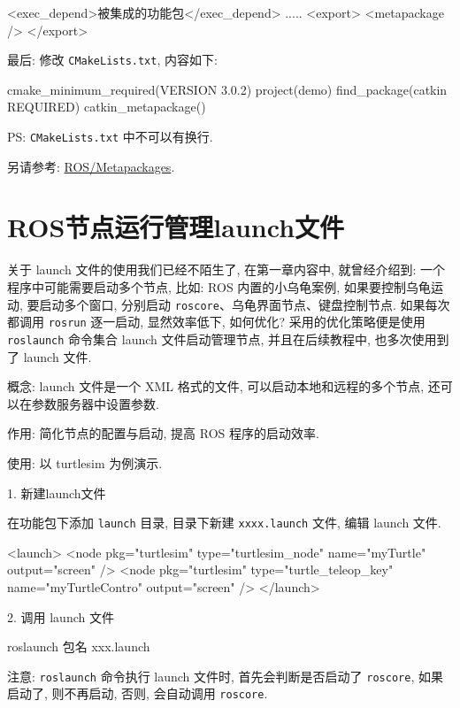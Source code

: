 \documentclass[openany, fontset=windowsold]{ctexbook}
\theoremstyle{kaiti}
\theoremstyle{normal}
\begin{document}
\begin{xml}
  <exec_depend>被集成的功能包</exec_depend>
  .....
  <export>
    <metapackage />
  </export>
\end{xml}

最后: 修改 \verb|CMakeLists.txt|, 内容如下:

\begin{bash}
  cmake_minimum_required(VERSION 3.0.2)
  project(demo)
  find_package(catkin REQUIRED)
  catkin_metapackage()
\end{bash}

PS: \verb|CMakeLists.txt| 中不可以有换行.

另请参考: \href{http://wiki.ros.org/catkin/package.xml#Metapackages}{ROS/Metapackages}.

\section{ROS节点运行管理launch文件}

关于 launch 文件的使用我们已经不陌生了, 在第一章内容中, 就曾经介绍到: 一个程序中可能需要启动多个节点, 比如: ROS 内置的小乌龟案例, 如果要控制乌龟运动, 要启动多个窗口, 分别启动 \verb|roscore|、乌龟界面节点、键盘控制节点. 如果每次都调用 \verb|rosrun| 逐一启动, 显然效率低下, 如何优化? 采用的优化策略便是使用 \verb|roslaunch| 命令集合 launch 文件启动管理节点, 并且在后续教程中, 也多次使用到了 launch 文件.

概念: launch 文件是一个 XML 格式的文件, 可以启动本地和远程的多个节点, 还可以在参数服务器中设置参数.

作用: 简化节点的配置与启动, 提高 ROS 程序的启动效率.

使用: 以 turtlesim 为例演示.

1. 新建launch文件

在功能包下添加 \verb|launch| 目录, 目录下新建 \verb|xxxx.launch| 文件, 编辑 launch 文件.

\begin{xml}
  <launch>
      <node pkg="turtlesim" type="turtlesim_node"     name="myTurtle" output="screen" />
      <node pkg="turtlesim" type="turtle_teleop_key"  name="myTurtleContro" output="screen" />
  </launch>
\end{xml}

2. 调用 launch 文件

\begin{bash}
  roslaunch 包名 xxx.launch
\end{bash}

注意: \verb|roslaunch| 命令执行 launch 文件时, 首先会判断是否启动了 \verb|roscore|, 如果启动了, 则不再启动, 否则, 会自动调用 \verb|roscore|.
\end{document}
